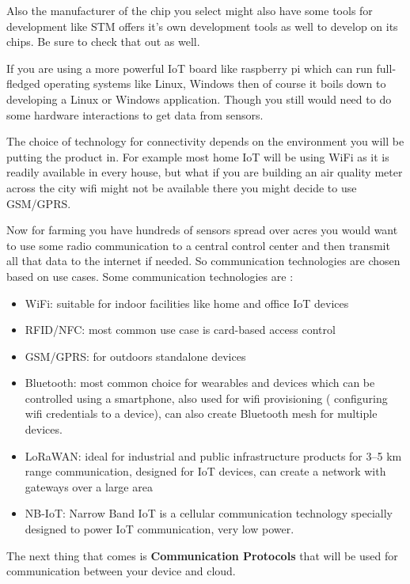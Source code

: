 \documentclass[12pt]{report}
\begin{document}
Also the manufacturer of the chip you select might also have some tools for development like STM offers it’s own development tools as well to develop on its chips. Be sure to check that out as well.

If you are using a more powerful IoT board like raspberry pi which can run full-fledged operating systems like Linux, Windows then of course it boils down to developing a Linux or Windows application. Though you still would need to do some hardware interactions to get data from sensors.


The choice of technology for connectivity depends on the environment you will be putting the product in. For example most home IoT will be using WiFi as it is readily available in every house, but what if you are building an air quality meter across the city wifi might not be available there you might decide to use GSM/GPRS.

Now for farming you have hundreds of sensors spread over acres you would want to use some radio communication to a central control center and then transmit all that data to the internet if needed.
So communication technologies are chosen based on use cases. Some communication technologies are :

\begin{itemize}
    \item WiFi: suitable for indoor facilities like home and office IoT devices
    \item RFID/NFC: most common use case is card-based access control
    \item GSM/GPRS: for outdoors standalone devices
    \item Bluetooth: most common choice for wearables and devices which can be controlled using a smartphone, also used for wifi provisioning ( configuring wifi credentials to a device), can also create Bluetooth mesh for multiple devices.
    \item LoRaWAN: ideal for industrial and public infrastructure products for 3–5 km range communication, designed for IoT devices, can create a network with gateways over a large area
    \item NB-IoT: Narrow Band IoT is a cellular communication technology specially designed to power IoT communication, very low power.
\end{itemize}

The next thing that comes is \textbf{Communication Protocols} that will be used for communication between your device and cloud.
\end{document}
